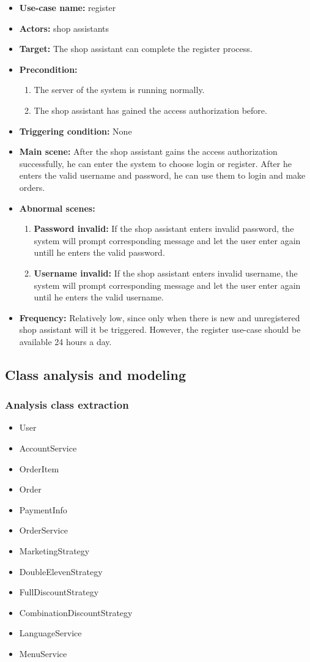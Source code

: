 \documentclass[a4paper]{report}
\begin{document}
 \begin{itemize}
\item \textbf{Use-case name:}  register
\item \textbf{Actors:} shop assistants
\item \textbf{Target:} The shop assistant can complete the register process.
\item \textbf{Precondition:} 
\begin{enumerate}
\item The server of the system is running normally.
\item The shop assistant has gained the access authorization before.
\end{enumerate}
\item \textbf{Triggering condition:} None
\item \textbf{Main scene:} After the shop assistant gains the access authorization successfully, he can enter the system to choose login or register. After he enters the valid username and password, he can use them to login and make orders.
\item \textbf{Abnormal scenes:} 
\begin{enumerate}
\item  \textbf{Password invalid:} If the shop assistant enters invalid password, the system will prompt corresponding message and let the user enter again untill he enters the valid password.
\item \textbf{Username invalid:} If the shop assistant enters invalid username, the system will prompt corresponding message and let the user enter again until he enters the valid username.
\end{enumerate}
\item \textbf{Frequency:}  Relatively low, since only when there is new and unregistered shop assistant will it be triggered. However, the register use-case should be available 24 hours a day. 
\end{itemize}

\subsection{Class analysis and modeling}
\subsubsection{Analysis class extraction}
\begin{itemize}
\item User
\item AccountService
\item OrderItem
\item Order
\item PaymentInfo
\item OrderService
\item MarketingStrategy
\item DoubleElevenStrategy
\item FullDiscountStrategy
\item CombinationDiscountStrategy
\item LanguageService
\item MenuService
\end{itemize}
\end{document}
